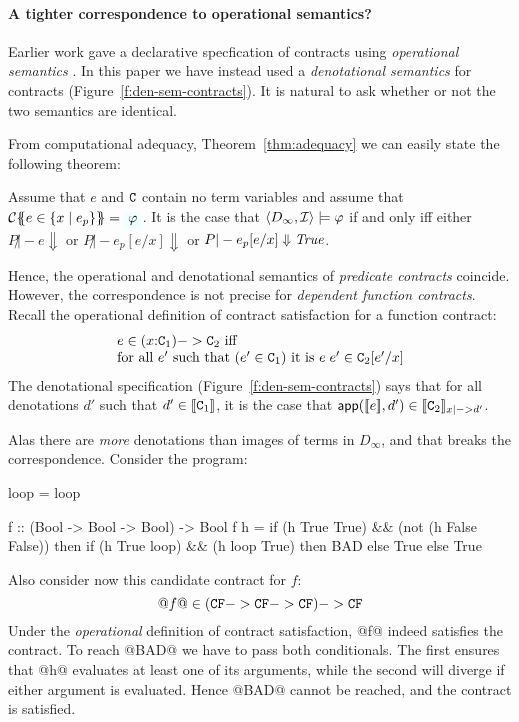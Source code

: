 
\paragraph{A tighter correspondence to operational semantics?}

Earlier work gave a declarative specfication of contracts using
\emph{operational semantics} \cite{xu+:contracts}.  In this paper we have
instead used a \emph{denotational semantics} for contracts (Figure~\ref{f:den-sem-contracts}).
It is natural to ask whether or not the two semantics are identical.

From computational adequacy, Theorem~\ref{thm:adequacy} we can easily state
the following theorem:
\begin{corollary} Assume that $e$ and $\Ct$ contain no term variables and
assume that $\ctrans{}{\cdot}{e \in \{x \mid e_p\}} = \formula{\phi}$. It is the case
that $\langle D_\infty,{\cal I}\rangle \models \phi$ if and only iff either
$P \not|- e \Downarrow$ or $P \not|- e_p[e/x] \Downarrow$ or $P |- e_p[e/x] \Downarrow \True$. \end{corollary}
Hence, the operational and denotational semantics of \emph{predicate contracts} coincide.
However, the correspondence is not precise for \emph{dependent function contracts}.
Recall the operational definition of contract satisfaction for
a function contract:
\[\begin{array}{l}
   e \in (x{:}\Ct_1) -> \Ct_2 \text{ iff} \\
   \text{for all } e' \text{ such that } (e' \in \Ct_1) \text{ it is } e\;e' \in \Ct_2[e'/x]
\end{array}\]
The denotational specification (Figure~\ref{f:den-sem-contracts})
says that for all denotations $d'$ such that
$d' \in \dbrace{\Ct_1}$, it is the case that
$\dapp(\dbrace{e},d') \in \dbrace{\Ct_2}_{x |->d'}$.

Alas there are {\em more} denotations than images of terms in $D_{\infty}$,
and that breaks the correspondence. Consider the program:
\begin{code}
  loop = loop

  f :: (Bool -> Bool -> Bool) -> Bool
  f h = if (h True True) && (not (h False False))
        then if (h True loop) && (h loop True)
             then BAD else True
        else True
\end{code}
Also consider now this candidate contract for $f$:
\[ @f@ \in (\CF -> \CF -> \CF) -> \CF \]
Under the \emph{operational} definition of contract satisfaction,
@f@ indeed satisfies the contract.
To reach @BAD@ we have to pass both conditionals.
The first ensures that @h@ evaluates at least one of its
arguments, while the second will diverge if either argument is evaluated.
Hence @BAD@ cannot be reached, and the contract is satisfied.

